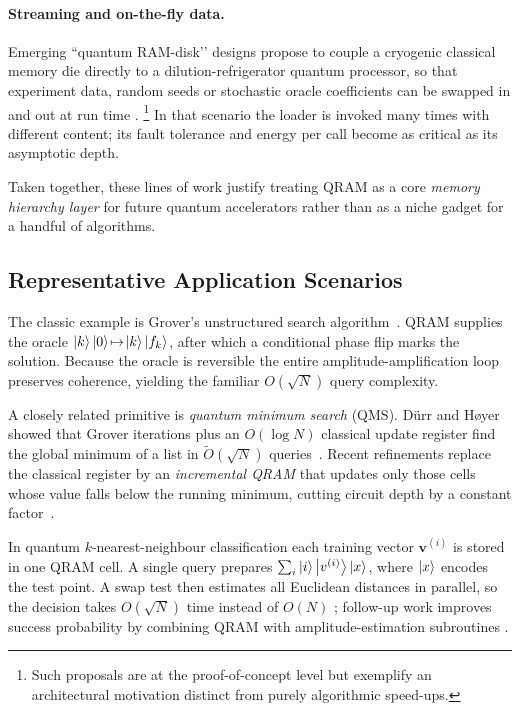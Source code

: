 \documentclass[11pt]{article}
\begin{document}
\paragraph{Streaming and on-the-fly data.}
Emerging “quantum RAM-disk’’ designs propose to couple a cryogenic
classical memory die directly to a dilution-refrigerator quantum
processor, so that experiment data, random seeds or stochastic oracle
coefficients can be swapped in and out at run time
\cite{Zhang2024}.%
\footnote{Such proposals are at the proof-of-concept level but
exemplify an architectural motivation distinct from purely algorithmic
speed-ups.}
In that scenario the loader is invoked many times with different
content; its fault tolerance and energy per call become as critical as
its asymptotic depth.

Taken together, these lines of work justify treating QRAM as a core
\emph{memory hierarchy layer} for future quantum accelerators rather
than as a niche gadget for a handful of algorithms.



\subsection{Representative Application Scenarios}

The classic example is Grover’s unstructured search
algorithm~\cite{Grover1996}.
QRAM supplies the oracle
$\ket{k}\ket{0}\!\mapsto\!\ket{k}\ket{f_{k}}$,
after which a conditional phase flip marks the solution.
Because the oracle is reversible the entire amplitude-amplification
loop preserves coherence, yielding the familiar
$O(\sqrt{N})$ query complexity.

A closely related primitive is \textit{quantum minimum search} (QMS).
Dürr and Høyer showed that Grover iterations plus an
$O(\log N)$ classical update register find the global minimum of a list
in $\widetilde{O}(\sqrt{N})$ queries~\cite{DurrHoyer1996}.
Recent refinements replace the classical register by an
\textit{incremental QRAM} that updates only those cells whose value
falls below the running minimum, cutting circuit depth by a constant
factor~\cite{Nakaji2021}.

In quantum $k$-nearest-neighbour classification each training vector
$\mathbf{v}^{(i)}$ is stored in one QRAM cell.
A single query prepares
$\sum_{i}\ket{i}\ket{v^{(i)}}\ket{x}$,
where $\ket{x}$ encodes the test point.
A swap test then estimates all Euclidean distances in parallel, so the
decision takes $O(\sqrt{N})$ time instead of $O(N)$
\cite{Wiebe2015}; follow-up work improves success probability by
combining QRAM with amplitude-estimation subroutines
\cite{Zoufal2022}.
\end{document}
